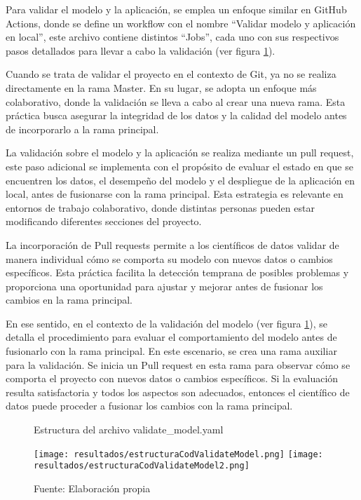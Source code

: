 Para validar el modelo y la aplicación, se emplea un enfoque similar en GitHub Actions, donde se define un workflow con el nombre ``Validar modelo y aplicación en local'', este archivo contiene distintos ``Jobs'', cada uno con sus respectivos pasos detallados para llevar a cabo la validación (ver figura \ref{fig:figuraEstructuraCodValidateModel}). 

\newpage

Cuando se trata de validar el proyecto en el contexto de Git, ya no se realiza directamente en la rama Master. En su lugar, se adopta un enfoque más colaborativo, donde la validación se lleva a cabo al crear una nueva rama. Esta práctica busca asegurar la integridad de los datos y la calidad del modelo antes de incorporarlo a la rama principal. \newline

La validación sobre el modelo y la aplicación se realiza mediante un pull request, este paso adicional se implementa con el propósito de evaluar el estado en que se encuentren los datos, el desempeño del modelo y el despliegue de la aplicación en local, antes de fusionarse con la rama principal. Esta estrategia es relevante en entornos de trabajo colaborativo, donde distintas personas pueden estar modificando diferentes secciones del proyecto. \newline

La incorporación de Pull requests permite a los científicos de datos validar de manera individual cómo se comporta su modelo con nuevos datos o cambios específicos. Esta práctica facilita la detección temprana de posibles problemas y proporciona una oportunidad para ajustar y mejorar antes de fusionar los cambios en la rama principal. \newline

En ese sentido, en el contexto de la validación del modelo (ver figura \ref{fig:figuraEstructuraCodValidateModel}), se detalla el procedimiento para evaluar el comportamiento del modelo antes de fusionarlo con la rama principal. En este escenario, se crea una rama auxiliar para la validación. Se inicia un Pull request en esta rama para observar cómo se comporta el proyecto con nuevos datos o cambios específicos. Si la evaluación resulta satisfactoria y todos los aspectos son adecuados, entonces el científico de datos puede proceder a fusionar los cambios con la rama principal. 

\newpage

\begin{figure}[h]
	\centering
	\caption{Estructura del archivo validate\_model.yaml}
	\texttt{[image: resultados/estructuraCodValidateModel.png]}
	\texttt{[image: resultados/estructuraCodValidateModel2.png]}
	\caption*{\footnotesize Fuente: Elaboración propia}
	\label{fig:figuraEstructuraCodValidateModel}
\end{figure}

